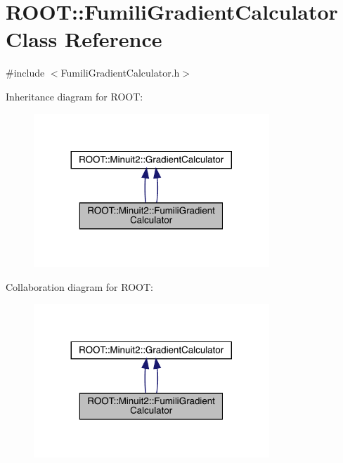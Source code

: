 \hypertarget{classROOT_1_1Minuit2_1_1FumiliGradientCalculator}{}\section{R\+O\+OT\+:\+:Fumili\+Gradient\+Calculator Class Reference}
\label{classROOT_1_1Minuit2_1_1FumiliGradientCalculator}


{\ttfamily \#include $<$Fumili\+Gradient\+Calculator.\+h$>$}



Inheritance diagram for R\+O\+OT\+:\nopagebreak
\begin{figure}[H]
\begin{center}
\leavevmode
\includegraphics[width=251pt]{da/dc6/classROOT_1_1Minuit2_1_1FumiliGradientCalculator__inherit__graph}
\end{center}
\end{figure}


Collaboration diagram for R\+O\+OT\+:\nopagebreak
\begin{figure}[H]
\begin{center}
\leavevmode
\includegraphics[width=251pt]{d0/d4a/classROOT_1_1Minuit2_1_1FumiliGradientCalculator__coll__graph}
\end{center}
\end{figure}
